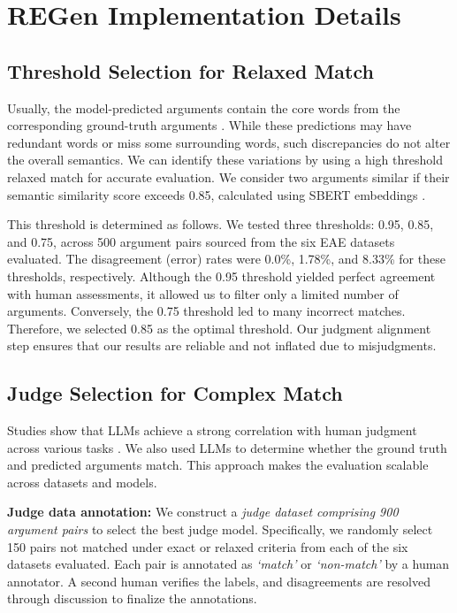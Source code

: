 \section{REGen Implementation Details}
\subsection{Threshold Selection for Relaxed Match}
\label{threshold-selection-process}
Usually, the model-predicted arguments contain the core words from the corresponding ground-truth arguments \cite{sharif-etal-2024-explicit, lu2024exactmatchsemanticallyreassessing}. While these predictions may have redundant words or miss some surrounding words, such discrepancies do not alter the overall semantics. We can identify these variations by using a high threshold relaxed match for accurate evaluation. We consider two arguments similar if their semantic similarity score exceeds 0.85, calculated using SBERT embeddings \cite{reimers-gurevych-2019-sentence}. 

This threshold is determined as follows. We tested three thresholds: 0.95, 0.85, and 0.75, across 500 argument pairs sourced from the six EAE datasets evaluated. The disagreement (error) rates were 0.0\%, 1.78\%, and 8.33\% for these thresholds, respectively. Although the 0.95 threshold yielded perfect agreement with human assessments, it allowed us to filter only a limited number of arguments. Conversely, the 0.75 threshold led to many incorrect matches. Therefore, we selected 0.85 as the optimal threshold. Our judgment alignment step ensures that our results are reliable and not inflated due to misjudgments.
 
\subsection{Judge Selection for Complex Match}
\label{section: judge-selection}
Studies show that LLMs achieve a strong correlation with human judgment across various tasks \cite{fu-etal-2024-gptscore,liu-etal-2023-g}. We also used LLMs to determine whether the ground truth and predicted arguments match. This approach makes the evaluation scalable across datasets and models. 

\textbf{Judge data annotation:} We construct a \textit{judge dataset comprising 900 argument pairs} to select the best judge model. Specifically, we randomly select 150 pairs not matched under exact or relaxed criteria from each of the six datasets evaluated. Each pair is annotated as \textit{`match'} or \textit{`non-match'} by a human annotator. A second human verifies the labels, and disagreements are resolved through discussion to finalize the annotations.


